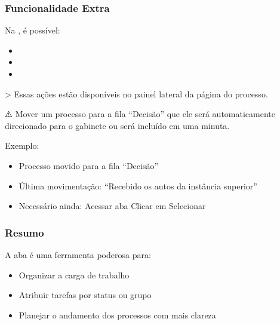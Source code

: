 \documentclass[letterpaper,10pt,brazil]{sphinxmanual}
\begin{document}
\subsubsection{Funcionalidade Extra}
\label{\detokenize{projud_10_filasprocessuais:funcionalidade-extra}}
\sphinxAtStartPar
Na , é possível:
\begin{itemize}
\item {} 
\sphinxAtStartPar
{}

\item {} 
\sphinxAtStartPar
{}

\item {} 
\sphinxAtStartPar
{}

\end{itemize}

\sphinxAtStartPar
\textgreater{} Essas ações estão disponíveis no painel lateral da página do processo.

\sphinxAtStartPar
⚠️ 
Mover um processo para a fila “Decisão”  que ele será automaticamente direcionado para o gabinete ou será incluído em uma minuta.

\sphinxAtStartPar
Exemplo:
\begin{itemize}
\item {} 
\sphinxAtStartPar
Processo movido para a fila “Decisão”

\item {} 
\sphinxAtStartPar
Última movimentação: “Recebido os autos da instância superior”

\item {} 
\sphinxAtStartPar
Necessário ainda:
\sphinxhyphen{} Acessar aba 
\sphinxhyphen{} Clicar em 
\sphinxhyphen{} Selecionar 

\end{itemize}


\subsubsection{Resumo}
\label{\detokenize{projud_10_filasprocessuais:resumo}}
\sphinxAtStartPar
A aba  é uma ferramenta poderosa para:
\begin{itemize}
\item {} 
\sphinxAtStartPar
Organizar a carga de trabalho

\item {} 
\sphinxAtStartPar
Atribuir tarefas por status ou grupo

\item {} 
\sphinxAtStartPar
Planejar o andamento dos processos com mais clareza

\end{itemize}
\end{document}
